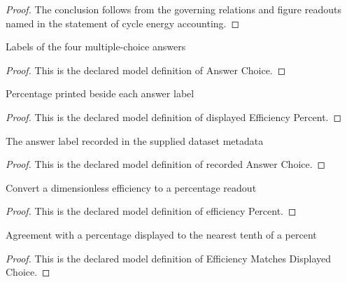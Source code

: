 \begin{proof}
  The conclusion follows from the governing relations and figure readouts named in the statement of cycle energy accounting.
\end{proof}
\begin{definition}
  \label{def:physics:phyx-mini-0352:phyxminiproblems-problemphyxmini0352-answerchoice}
  Labels of the four multiple-choice answers
\end{definition}
\begin{proof}
  This is the declared model definition of Answer Choice.
\end{proof}
\begin{definition}
  \label{def:physics:phyx-mini-0352:phyxminiproblems-problemphyxmini0352-displayedefficiencypercent}
  Percentage printed beside each answer label
\end{definition}
\begin{proof}
  This is the declared model definition of displayed Efficiency Percent.
\end{proof}
\begin{definition}
  \label{def:physics:phyx-mini-0352:phyxminiproblems-problemphyxmini0352-recordedanswerchoice}
  The answer label recorded in the supplied dataset metadata
\end{definition}
\begin{proof}
  This is the declared model definition of recorded Answer Choice.
\end{proof}
\begin{definition}
  \label{def:physics:phyx-mini-0352:phyxminiproblems-problemphyxmini0352-efficiencypercent}
  Convert a dimensionless efficiency to a percentage readout
\end{definition}
\begin{proof}
  This is the declared model definition of efficiency Percent.
\end{proof}
\begin{definition}
  \label{def:physics:phyx-mini-0352:phyxminiproblems-problemphyxmini0352-efficiencymatchesdisplayedchoice}
  Agreement with a percentage displayed to the nearest tenth of a percent
\end{definition}
\begin{proof}
  This is the declared model definition of Efficiency Matches Displayed Choice.
\end{proof}
